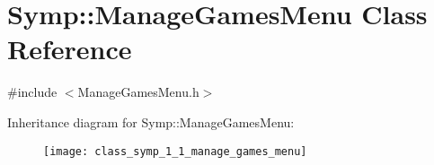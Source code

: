 \hypertarget{class_symp_1_1_manage_games_menu}{\section{Symp\-:\-:Manage\-Games\-Menu Class Reference}
\label{class_symp_1_1_manage_games_menu}
}


{\ttfamily \#include $<$Manage\-Games\-Menu.\-h$>$}

Inheritance diagram for Symp\-:\-:Manage\-Games\-Menu\-:\begin{figure}[H]
\begin{center}
\leavevmode
\texttt{[image: class\_symp\_1\_1\_manage\_games\_menu]}
\end{center}
\end{figure}

